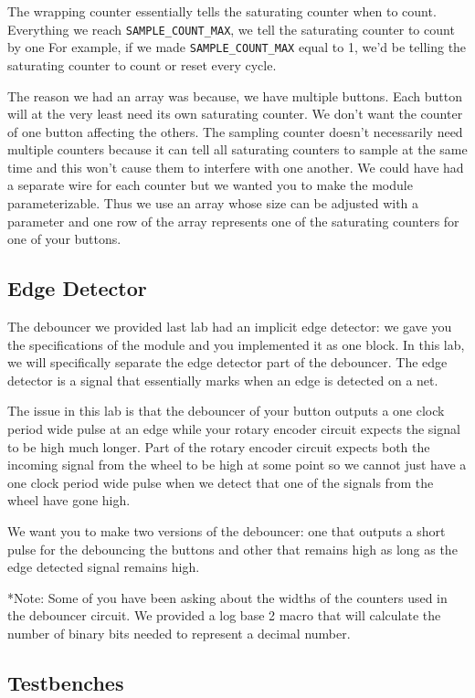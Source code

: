 \documentclass[11pt]{article}
\begin{document}
The wrapping counter essentially tells the saturating counter when to count. Everything we reach \verb|SAMPLE_COUNT_MAX|, we tell the saturating counter to count by one For example, if we made \verb|SAMPLE_COUNT_MAX| equal to 1, we'd be telling the saturating counter to count or reset every cycle. 

The reason we had an array was because, we have multiple buttons. Each button will at the very least need its own saturating counter. We don't want the counter of one button affecting the others. The sampling counter doesn't necessarily need multiple counters because it can tell all saturating counters to sample at the same time and this won't cause them to interfere with one another. We could have had a separate wire for each counter but we wanted you to make the module parameterizable. Thus we use an array whose size can be adjusted with a parameter and one row of the array represents one of the saturating counters for one of your buttons. 

\subsection{Edge Detector}

The debouncer we provided last lab had an implicit edge detector: we gave you the specifications of the module and you implemented it as one block. In this lab, we will specifically separate the edge detector part of the debouncer. The edge detector is a signal that essentially marks when an edge is detected on a net. 

The issue in this lab is that the debouncer of your button outputs a one clock period wide pulse at an edge while your rotary encoder circuit expects the signal to be high much longer. Part of the rotary encoder circuit expects both the incoming signal from the wheel to be high at some point so we cannot just have a one clock period wide pulse when we detect that one of the signals from the wheel have gone high.

We want you to make two versions of the debouncer: one that outputs a short pulse for the debouncing the buttons and other that remains high as long as the edge detected signal remains high. 

*Note: Some of you have been asking about the widths of the counters used in the debouncer circuit. We provided a log base 2 macro that will calculate the number of binary bits needed to represent a decimal number. 

\subsection{Testbenches}
\end{document}
